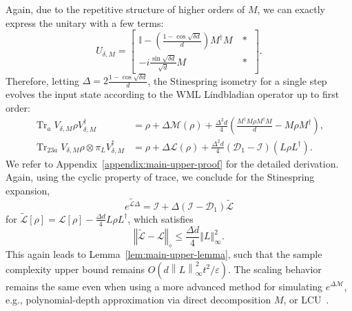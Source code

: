 \documentclass[superscriptaddress,amsmath,amssymb,aps,pra,letterpaper,tightenlines,notitlepages,12pt]{revtex4-2}
\begin{document}
Again, due to the repetitive structure of higher orders of $M$, we can exactly express the unitary with a few terms:
\begin{equation}
    U_{\delta, M} = \begin{bmatrix}
        \mathbb{I}-\left(\frac{1-\cos\sqrt{\delta d}}{d}\right)M^\dagger M & ~ * ~\\ -i\frac{\sin\sqrt{\delta d}}{\sqrt{d}}M & ~ * ~
    \end{bmatrix}.
\end{equation}
Therefore, letting $\Delta=2\tfrac{1-\cos\sqrt{\delta d}}{d}$, the Stinespring isometry for a single step evolves the input state according to the WML Lindbladian operator up to first order:
\begin{align}
    \operatorname{Tr}_{a}V_{\delta, M}\rho V_{\delta, M}^\dagger & = \rho+\Delta\mathcal{M}(\rho)+\frac{\Delta^2d}{4}\left(\frac{M^\dagger M\rho M^\dagger M}{d}-M\rho M^\dagger\right),\\
    \operatorname{Tr}_{23a}V_{\delta, M}\rho \otimes \pi_L V_{\delta, M}^\dagger & = \rho+\Delta\mathcal{L}(\rho)+\frac{\Delta^2d}{4}(\mathcal{D}_1-\mathcal{I})(L\rho L^\dagger).
\end{align}
We refer to Appendix~\ref{appendix:main-upper-proof} for the detailed derivation. Again, using the cyclic property of trace, we conclude for the Stinespring expansion, 
\begin{equation}
    \widetilde{e^{\mathcal{L}\Delta}}=\mathcal{I} + \Delta(\mathcal{I}-\mathcal{D}_1)\widetilde{\mathcal{L}}
\end{equation}
for  $\widetilde{\mathcal{L}}[\rho]=\mathcal{L}[\rho]-\frac{\Delta d}{4}L\rho L^\dagger$, which satisfies
\begin{equation}
    \left\Vert\widetilde{\mathcal{L}}-\mathcal{L}\right\Vert_\diamond\leq\frac{\Delta d}{4}\left\Vert L\right\Vert_\infty^2.
\end{equation}
This again leads to Lemma~\ref{lem:main-upper-lemma}, such that the sample complexity upper bound remains $O(d\left\|L\right\|_\infty^2t^2/\varepsilon)$. The scaling behavior remains the same even when using a more advanced method for simulating $e^{\Delta\mathcal{M}}$, e.g., polynomial-depth approximation via direct decomposition $M$, or LCU~\cite[Appendices B and C]{sims2025DigitalQuantumSimulations}.
\end{document}
